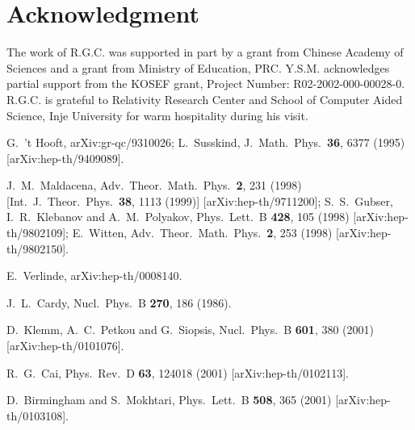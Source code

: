 \documentclass[a4paper,12pt]{article}
\begin{document}
\section*{Acknowledgment}

The work  of R.G.C. was supported in part by a grant from Chinese
Academy of Sciences and a grant from Ministry of Education, PRC.  
Y.S.M. acknowledges partial support from the KOSEF grant, Project 
Number: R02-2002-000-00028-0. R.G.C. is grateful to Relativity Research Center 
and School of Computer Aided Science, Inje University for warm hospitality 
during his visit.

\begin{thebibliography}{99}
G.~'t Hooft,
arXiv:gr-qc/9310026;
L.~Susskind,
J.\ Math.\ Phys.\  {\bf 36}, 6377 (1995) [arXiv:hep-th/9409089].

J.~M.~Maldacena,
Adv.\ Theor.\ Math.\ Phys.\  {\bf 2}, 231 (1998) [Int.\ J.\
Theor.\ Phys.\  {\bf 38}, 1113 (1999)] [arXiv:hep-th/9711200];
S.~S.~Gubser, I.~R.~Klebanov and A.~M.~Polyakov,
Phys.\ Lett.\ B {\bf 428}, 105 (1998) [arXiv:hep-th/9802109];
E.~Witten,
Adv.\ Theor.\ Math.\ Phys.\  {\bf 2}, 253 (1998)
[arXiv:hep-th/9802150].

E.~Verlinde,
arXiv:hep-th/0008140.

J.~L.~Cardy,
Nucl.\ Phys.\ B {\bf 270}, 186 (1986).

D.~Klemm, A.~C.~Petkou and G.~Siopsis,
Nucl.\ Phys.\ B {\bf 601}, 380 (2001) [arXiv:hep-th/0101076].

R.~G.~Cai,
Phys.\ Rev.\ D {\bf 63}, 124018 (2001) [arXiv:hep-th/0102113].

D.~Birmingham and S.~Mokhtari,
Phys.\ Lett.\ B {\bf 508}, 365 (2001) [arXiv:hep-th/0103108].


\end{thebibliography}
\end{document}
